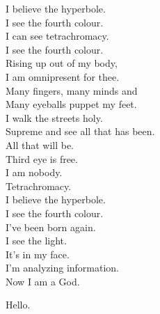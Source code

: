 I believe the hyperbole. \\
I see the fourth colour. \\
I can see tetrachromacy. \\
I see the fourth colour. \\

Rising up out of my body, \\
I am omnipresent for thee. \\
Many fingers, many minds and \\
Many eyeballs puppet my feet. \\
I walk the streets holy. \\
Supreme and see all that has been. \\

All that will be. \\
Third eye is free. \\
I am nobody. \\
Tetrachromacy. \\

I believe the hyperbole. \\
I see the fourth colour. \\

I've been born again. \\
I see the light. \\
It's in my face. \\
I'm analyzing information. \\
Now I am a God. \\



Hello. \\
